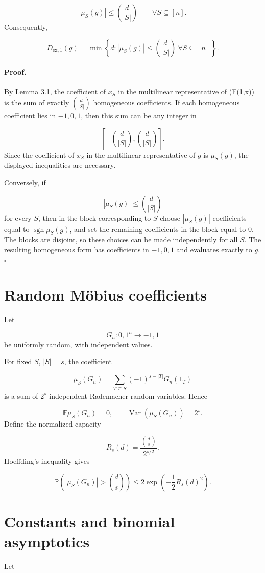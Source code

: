 \documentclass[11pt]{article}
\theoremstyle{definition}
\begin{document}
\[
|\mu_S(g)|\le \binom d{|S|}
\qquad
\forall S\subseteq[n].
\]
Consequently,

\[
D_{\mathrm{ex},1}(g)
=
\min\left\{
d:
|\mu_S(g)|\le \binom d{|S|}
\ \forall S\subseteq[n]
\right\}.
\]
\paragraph{Proof.}
By Lemma 3.1, the coefficient of $x_S$ in the multilinear representative of (F(1,x)) is the sum of exactly $\binom d{|S|}$ homogeneous coefficients. If each homogeneous coefficient lies in ${-1,0,1}$, then this sum can be any integer in

\[
\left[-\binom d{|S|},\binom d{|S|}\right].
\]
Since the coefficient of $x_S$ in the multilinear representative of $g$ is $\mu_S(g)$, the displayed inequalities are necessary.

Conversely, if

\[
|\mu_S(g)|\le \binom d{|S|}
\]
for every $S$, then in the block corresponding to $S$ choose $|\mu_S(g)|$ coefficients equal to $\operatorname{sgn}\mu_S(g)$, and set the remaining coefficients in the block equal to $0$. The blocks are disjoint, so these choices can be made independently for all $S$. The resulting homogeneous form has coefficients in ${-1,0,1}$ and evaluates exactly to $g$. $\square$

\section{Random Möbius coefficients}
Let

\[
G_n:{0,1}^n\to{-1,1}
\]
be uniformly random, with independent values.

For fixed $S$, $|S|=s$, the coefficient

\[
\mu_S(G_n)
=
\sum_{T\subseteq S}
(-1)^{s-|T|}G_n(1_T)
\]
is a sum of $2^s$ independent Rademacher random variables. Hence

\[
\mathbb{E}\mu_S(G_n)=0,
\qquad
\operatorname{Var}(\mu_S(G_n))=2^s.
\]
Define the normalized capacity

\[
R_s(d)=\frac{\binom ds}{2^{s/2}}.
\]
Hoeffding's inequality gives

\[
\mathbb{P}\left(
|\mu_S(G_n)|>\binom ds
\right)
\le
2\exp\left(
-\frac12R_s(d)^2
\right).
\]
\section{Constants and binomial asymptotics}
Let
\end{document}
